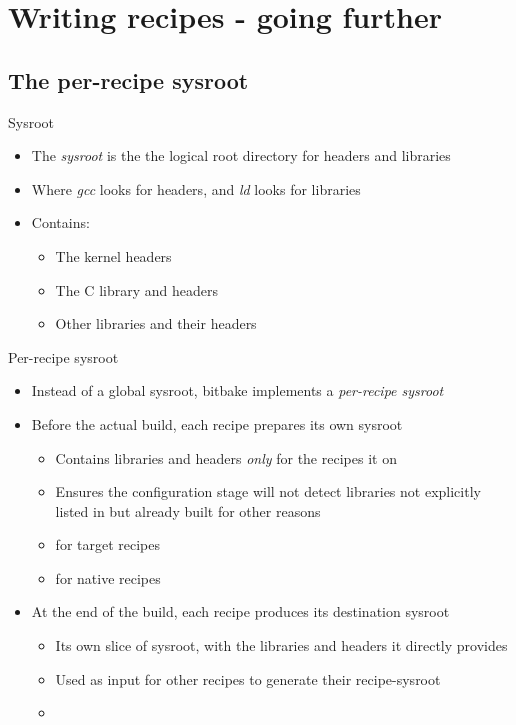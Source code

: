 \section{Writing recipes - going further}

\subsection{The per-recipe sysroot}

\begin{frame}{Sysroot}
  \begin{itemize}
    \item The {\em sysroot} is the the logical root directory for headers
      and libraries
    \item Where {\em gcc} looks for headers, and {\em ld} looks for
      libraries
    \item Contains:
      \begin{itemize}
        \item The kernel headers
        \item The C library and headers
        \item Other libraries and their headers
      \end{itemize}
  \end{itemize}
\end{frame}

\begin{frame}{Per-recipe sysroot}
  \begin{itemize}
    \item Instead of a global sysroot, bitbake implements a {\em
      per-recipe sysroot}
    \item Before the actual build, each recipe prepares its own sysroot
      \begin{itemize}
        \item Contains libraries and headers {\em only} for the recipes it
           on
        \item Ensures the configuration stage will not detect libraries not
          explicitly listed in  but already built for other
          reasons
        \item {} for target recipes
        \item {} for native recipes
      \end{itemize}
    \item At the end of the build, each recipe produces its destination
      sysroot
      \begin{itemize}
        \item Its own slice of sysroot, with the libraries and headers it
          directly provides
        \item Used as input for other recipes to generate their
          recipe-sysroot
        \item {}
      \end{itemize}
  \end{itemize}
\end{frame}

